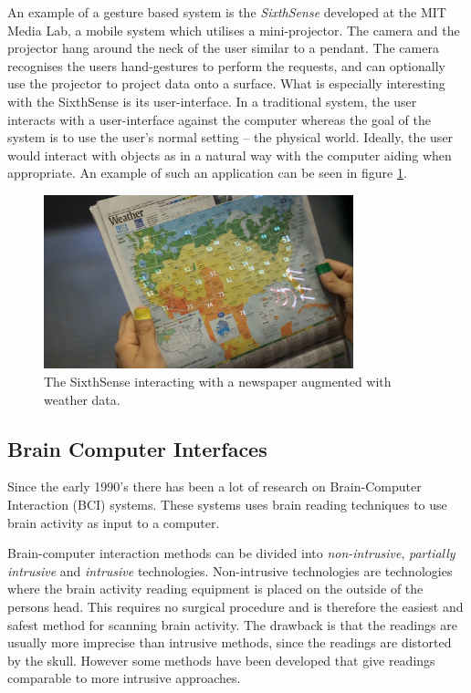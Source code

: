 An example of a gesture based system is the \emph{SixthSense} developed at the MIT Media Lab, a mobile system which utilises a mini-projector. The camera and the projector hang around the neck of the user similar to a pendant. The camera recognises the users hand-gestures to perform the requests, and can optionally use the projector to project data onto a surface. What is especially interesting with the SixthSense is its user-interface. In a traditional system, the user interacts with a user-interface against the computer whereas the goal of the system is to use the user's normal setting -- the physical world\cite{Mistry:2009:SWG:1667146.1667160}. Ideally, the user would interact with objects as in a natural way with the computer aiding when appropriate. An example of such an application can be seen in figure \ref{sixthsense}.


\begin{figure}[]
\includegraphics[width=0.8\textwidth] {bilder/newspaper.jpg}
\caption{The SixthSense interacting with a newspaper augmented with weather data.}
\label{sixthsense}
\end{figure}
\nocite{newspaper}


\subsection{Brain Computer Interfaces}

Since the early 1990's there has been a lot of research on Brain-Computer Interaction (BCI) systems\cite{lebedev2006brain}. These systems uses brain reading techniques to use brain activity as input to a computer.

Brain-computer interaction methods can be divided into \emph{non-intrusive}, \emph{partially intrusive} and \emph{intrusive} technologies\cite{legobrain}. Non-intrusive technologies are technologies where the brain activity reading equipment is placed on the outside of the persons head. This requires no surgical procedure and is therefore the easiest and safest method for scanning brain activity. The drawback is that the readings are usually more imprecise than intrusive methods, since the readings are distorted by the skull. However some methods\cite{doud2011continuous} have been developed that give readings comparable to more intrusive approaches.

